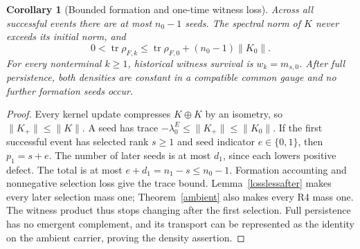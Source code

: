 \documentclass[11pt,letterpaper]{article}
\newcommand{\tr}{\operatorname{tr}}
\newtheorem{corollary}[theorem]{Corollary}
\theoremstyle{definition}
\numberwithin{equation}{section}
\begin{document}
\begin{corollary}[Bounded formation and one-time witness loss]\label{finitebudget}
Across all successful events there are at most $n_0-1$ seeds. The spectral norm of $K$ never exceeds its initial norm, and
\begin{equation}
0<\tr\rho_{F,k}\leq\tr\rho_{F,0}+(n_0-1)\|K_0\|.
\end{equation}
For every nonterminal $k\geq1$, historical witness survival is $w_k=m_{s,0}$. After full persistence, both densities are constant in a compatible common gauge and no further formation seeds occur.
\end{corollary}
\begin{proof}
Every kernel update compresses $K\oplus K$ by an isometry, so $\|K_+\|\leq\|K\|$. A seed has trace $-\lambda_0^E\leq\|K_+\|\leq\|K_0\|$. If the first successful event has selected rank $s\geq1$ and seed indicator $e\in\{0,1\}$, then $p_1=s+e$. The number of later seeds is at most $d_1$, since each lowers positive defect. The total is at most $e+d_1=n_1-s\leq n_0-1$. Formation accounting and nonnegative selection loss give the trace bound. Lemma~\ref{losslessafter} makes every later selection mass one; Theorem~\ref{ambient} also makes every R4 mass one. The witness product thus stops changing after the first selection. Full persistence has no emergent complement, and its transport can be represented as the identity on the ambient carrier, proving the density assertion.
\end{proof}
\end{document}
